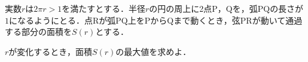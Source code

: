 \documentclass[../../main.tex]{subfiles}
\begin{document}
実数$r$は$2\pi r >1$を満たすとする．半径$r$の円の周上に2点$\mathrm{P}$，$\mathrm{Q}$を，弧$\mathrm{PQ}$の長さが$1$になるようにとる．点$\mathrm{R}$が弧$\mathrm{PQ}$上を$\mathrm{P}$から$\mathrm{Q}$まで動くとき，弦$\mathrm{PR}$が動いて通過する部分の面積を$S(r)$とする．

$r$が変化するとき，面積$S(r)$の最大値を求めよ．
\end{document}
